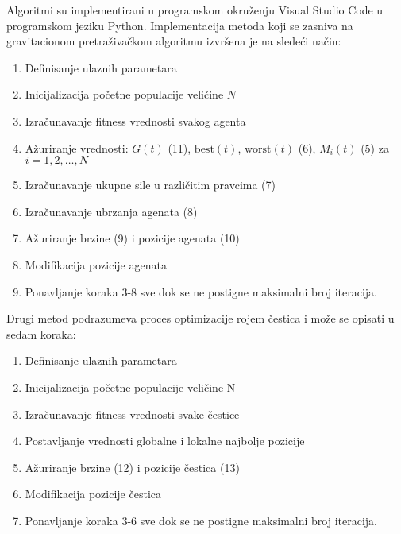 Algoritmi su implementirani u programskom okruženju Visual Studio Code u programskom jeziku Python. Implementacija metoda koji se zasniva na gravitacionom pretraživačkom algoritmu izvršena je na sledeći način:

\begin{enumerate}
    \item Definisanje ulaznih parametara
    \item Inicijalizacija početne populacije veličine $N$
    \item Izračunavanje fitness vrednosti svakog agenta 
    \item Ažuriranje vrednosti: $G(t)$ (11), $\mathrm{best}(t)$, $\mathrm{worst}(t)$ (6), $M_i(t)$ (5) za $i = 1, 2,\dots, N$
    \item Izračunavanje ukupne sile u različitim pravcima (7)
    \item Izračunavanje ubrzanja agenata (8)
    \item Ažuriranje brzine (9) i pozicije agenata (10)
    \item Modifikacija pozicije agenata 
    \item Ponavljanje koraka 3-8 sve dok se ne postigne maksimalni broj iteracija.
\end{enumerate}

Drugi metod podrazumeva proces optimizacije rojem čestica i može se opisati u sedam koraka:

\begin{enumerate}
    \item Definisanje ulaznih parametara
    \item Inicijalizacija početne populacije veličine N
    \item Izračunavanje fitness vrednosti svake čestice
    \item Postavljanje vrednosti globalne i lokalne najbolje pozicije
    \item Ažuriranje brzine (12) i pozicije čestica (13)
    \item Modifikacija pozicije čestica 
    \item Ponavljanje koraka 3-6 sve dok se ne postigne maksimalni broj iteracija.
\end{enumerate}

